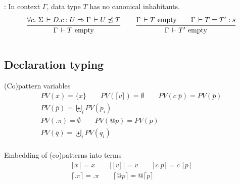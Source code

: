 \documentclass[acmlarge,fleqn]{acmart}\settopmatter{}
\begin{document}
: In context $\Gamma$, data type $T$ has no canonical inhabitants.
\begin{gather*}
\ru{\forall c.\ \Sigma \der D.c : U \Rightarrow \Gamma \der U \noinstance T
  }{\Gamma \der T \mempty
  }
\qquad
\ru{\Gamma \der T \mempty \qquad \Gamma \der T = T' : s
  }{\Gamma \der T' \mempty}
\end{gather*}

\begin{verbatim}

\end{verbatim}
\subsection{Declaration typing}

(Co)pattern variables 
\begin{gather*}
PV(x) = \{ x \} \qquad PV (\lceil v \rceil) = \emptyset \qquad PV(c\; \bar{p}) = PV(\bar{p}) \\
PV(\bar{p}) = \biguplus_i PV(p_i) \\
PV(.\pi) = \emptyset \qquad PV(@p) = PV(p) \\
PV(\bar{q}) = \biguplus_i PV(q_i) \\
\end{gather*}


Embedding of (co)patterns into terms 
\begin{gather*}
\lceil x \rceil = x \qquad
\lceil \lfloor v \rfloor \rceil = v \qquad
\lceil c\; \bar{p} \rceil = c\; \lceil \bar{p} \rceil \\
\lceil .\pi \rceil = .\pi \qquad
\lceil @p \rceil = @ \lceil p \rceil
\end{gather*}


%
%
\end{document}
